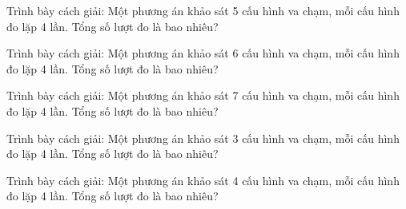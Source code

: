 \begin{bt}
Trình bày cách giải: Một phương án khảo sát 5 cấu hình va chạm, mỗi cấu hình đo lặp 4 lần. Tổng số lượt đo là bao nhiêu?
\end{bt}

\begin{bt}
Trình bày cách giải: Một phương án khảo sát 6 cấu hình va chạm, mỗi cấu hình đo lặp 4 lần. Tổng số lượt đo là bao nhiêu?
\end{bt}

\begin{bt}
Trình bày cách giải: Một phương án khảo sát 7 cấu hình va chạm, mỗi cấu hình đo lặp 4 lần. Tổng số lượt đo là bao nhiêu?
\end{bt}

\begin{bt}
Trình bày cách giải: Một phương án khảo sát 3 cấu hình va chạm, mỗi cấu hình đo lặp 4 lần. Tổng số lượt đo là bao nhiêu?
\end{bt}

\begin{bt}
Trình bày cách giải: Một phương án khảo sát 4 cấu hình va chạm, mỗi cấu hình đo lặp 4 lần. Tổng số lượt đo là bao nhiêu?
\end{bt}
